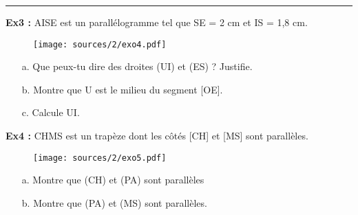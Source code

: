 \documentclass[11pt]{article}
\newcommand{\horrule}[1]{\rule{\linewidth}{#1}} %
\newcommand{\Pointille}[1][3]{\multido{}{#1}{ \makebox[\linewidth]{\dotfill}\\[\parskip]}}
\begin{document}
\horrule{1px}
\setlength{\columnseprule}{1pt}
\begin{multicols}{2}


\textbf{Ex3 :} AISE est un parallélogramme tel que SE = 2 cm et IS = 1,8 cm.
  \begin{figure}[H]
    \centering
    \texttt{[image: sources/2/exo4.pdf]}
  \end{figure}
  \begin{itemize}
  \item[a.] Que peux-tu dire des droites (UI) et (ES) ? Justifie. \newline
    \Pointille[3]
  \item[b.] Montre que U est le milieu du segment [OE]. \newline
    \Pointille[5]
  \item[c.] Calcule UI. \newline
    \Pointille[2] 
  \end{itemize}



\textbf{Ex4 :} CHMS est un trapèze dont les côtés [CH] et [MS] sont parallèles.
  \begin{figure}[H]
    \centering
    \texttt{[image: sources/2/exo5.pdf]}
  \end{figure}
  \begin{itemize}
  \item[a.] Montre que (CH) et (PA) sont parallèles \newline
    \Pointille[7]
  \item[b.] Montre que (PA) et (MS) sont parallèles. \newline
    \Pointille[7]
  \end{itemize}

\end{multicols}
\end{document}
